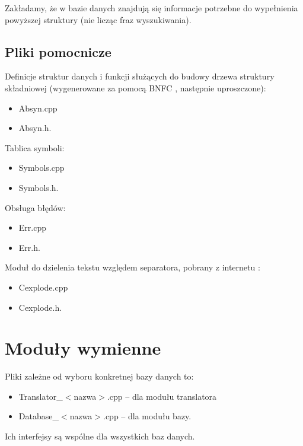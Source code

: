 Zakładamy, że w bazie danych znajdują się informacje potrzebne do wypełnienia powyższej struktury (nie licząc fraz wyszukiwania).

\subsection{Pliki pomocnicze}
Definicje struktur danych i funkcji służących do budowy drzewa struktury składniowej (wygenerowane za pomocą BNFC \cite{bnfc}, 
następnie uproszczone):
\begin{itemize}
 \item Absyn.cpp
 \item Absyn.h.
\end{itemize}
Tablica symboli:
\begin{itemize}
 \item Symbols.cpp
\item Symbols.h.
\end{itemize}
Obsługa błędów:
\begin{itemize}
 \item Err.cpp
\item Err.h.
\end{itemize}
Moduł do dzielenia tekstu względem separatora, pobrany z internetu \cite{cexplode}:
\begin{itemize}
 \item Cexplode.cpp
 \item Cexplode.h.
\end{itemize}


\section{Moduły wymienne}
Pliki zależne od wyboru konkretnej bazy danych to:
\begin{itemize}
 \item Translator\_$<$nazwa$>$.cpp -- dla modułu translatora
\item Database\_$<$nazwa$>$.cpp -- dla modułu bazy.
\end{itemize}
Ich interfejsy są wspólne dla wszystkich baz danych.
